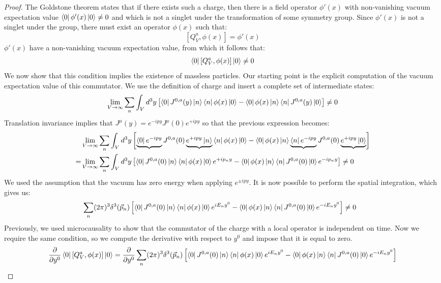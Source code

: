 \documentclass[../main.tex]{subfiles}
\begin{document}
\begin{proof}
The Goldstone theorem states that if there exists such a charge, then there is a field operator $\phi'(x)$ with non-vanishing vacuum expectation value $\bra{0}\phi'(x)\ket{0}\neq0$ and which is not a singlet under the transformation of some symmetry group.  Since $\phi'(x)$ is not a singlet under the group, there must exist an operator $\phi(x)$ such that:
\[
[Q_V^a,\phi(x)]=\phi'(x)
\]
$\phi'(x)$ have a non-vanishing vacuum expectation value, from which it follows that:
\[
\bra{0}[Q_V^a,\phi(x)]\ket{0}\neq0
\]
We now show that this condition implies the existence of massless particles. Our starting point is the explicit computation of the vacuum expectation value of this commutator. We use the definition of charge and insert a complete set of intermediate states:
\[
\lim_{V\to\infty}\sum_n\int_V d^3y\left[\bra{0}J^{0,a}(y)\ket{n}\bra{n}\phi(x)\ket{0}-\bra{0}\phi(x)\ket{n}\bra{n}J^{0,a}(y)\ket{0}\right]\neq0
\]
Translation invariance implies that $J^\mu(y)=e^{-ipy}J^\mu(0)e^{+ipy}$ so that the previous expression becomes:
\begin{align*}
&\lim_{V\to\infty}\sum_n\int_V d^3y\left[\underbrace{\bra{0}e^{-ipy}}J^{0,a}(0)\underbrace{e^{+ipy}\ket{n}}\bra{n}\phi(x)\ket{0}-\bra{0}\phi(x)\ket{n}\underbrace{\bra{n}e^{-ipy}}J^{0,a}(0)\underbrace{e^{+ipy}\ket{0}}\right]\\
=&\lim_{V\to\infty}\sum_n\int_V d^3y\left[\bra{0}J^{0,a}(0)\ket{n}\bra{n}\phi(x)\ket{0}e^{+ip_ny}-\bra{0}\phi(x)\ket{n}\bra{n}J^{0,a}(0)\ket{0}e^{-ip_ny}\right]\neq0
\end{align*}
We used the assumption that the vacuum has zero energy when applying $e^{\pm ipy}$. It is now possible to perform the spatial integration, which gives us:
\begin{align*}
&\sum_n(2\pi)^3\delta^3(\Vec{p}_n)\left[\bra{0}J^{0,a}(0)\ket{n}\bra{n}\phi(x)\ket{0}e^{iE_ny^0}-\bra{0}\phi(x)\ket{n}\bra{n}J^{0,a}(0)\ket{0}e^{-iE_ny^0}\right]\neq0
\end{align*}
Previously, we used microcausality to show that the commutator of the charge with a local operator is independent on time. Now we require the same condition, so we compute the derivative with respect to $y^0$ and impose that it is equal to zero.
\begin{align*}
\frac{\partial}{\partial y^0}\bra{0}[Q_V^a,\phi(x)]\ket{0}&=\frac{\partial}{\partial y^0}\sum_n(2\pi)^3\delta^3(\Vec{p}_n)\left[\bra{0}J^{0,a}(0)\ket{n}\bra{n}\phi(x)\ket{0}e^{iE_ny^0}-\bra{0}\phi(x)\ket{n}\bra{n}J^{0,a}(0)\ket{0}e^{-iE_ny^0}\right]\\

\end{align*}
\end{proof}
\end{document}
